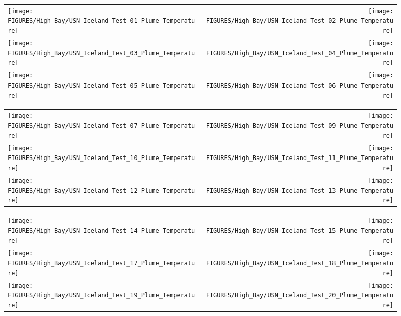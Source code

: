 \begin{figure}[h!]
\begin{tabular*}{\textwidth}{l@{\extracolsep{\fill}}r}
\texttt{[image: FIGURES/High\_Bay/USN\_Iceland\_Test\_01\_Plume\_Temperature]} &
\texttt{[image: FIGURES/High\_Bay/USN\_Iceland\_Test\_02\_Plume\_Temperature]} \\
\texttt{[image: FIGURES/High\_Bay/USN\_Iceland\_Test\_03\_Plume\_Temperature]} &
\texttt{[image: FIGURES/High\_Bay/USN\_Iceland\_Test\_04\_Plume\_Temperature]} \\
\texttt{[image: FIGURES/High\_Bay/USN\_Iceland\_Test\_05\_Plume\_Temperature]} &
\texttt{[image: FIGURES/High\_Bay/USN\_Iceland\_Test\_06\_Plume\_Temperature]} \\
\end{tabular*}
\label{USN_Plume_Iceland_Plume_Temperature}
\end{figure}

\begin{figure}[p]
\begin{tabular*}{\textwidth}{l@{\extracolsep{\fill}}r}
\texttt{[image: FIGURES/High\_Bay/USN\_Iceland\_Test\_07\_Plume\_Temperature]} &
\texttt{[image: FIGURES/High\_Bay/USN\_Iceland\_Test\_09\_Plume\_Temperature]} \\
\texttt{[image: FIGURES/High\_Bay/USN\_Iceland\_Test\_10\_Plume\_Temperature]} &
\texttt{[image: FIGURES/High\_Bay/USN\_Iceland\_Test\_11\_Plume\_Temperature]} \\
\texttt{[image: FIGURES/High\_Bay/USN\_Iceland\_Test\_12\_Plume\_Temperature]} &
\texttt{[image: FIGURES/High\_Bay/USN\_Iceland\_Test\_13\_Plume\_Temperature]} \\
\end{tabular*}
\label{USN_Plume_Iceland_2}
\end{figure}

\begin{figure}[p]
\begin{tabular*}{\textwidth}{l@{\extracolsep{\fill}}r}
\texttt{[image: FIGURES/High\_Bay/USN\_Iceland\_Test\_14\_Plume\_Temperature]} &
\texttt{[image: FIGURES/High\_Bay/USN\_Iceland\_Test\_15\_Plume\_Temperature]} \\
\texttt{[image: FIGURES/High\_Bay/USN\_Iceland\_Test\_17\_Plume\_Temperature]} &
\texttt{[image: FIGURES/High\_Bay/USN\_Iceland\_Test\_18\_Plume\_Temperature]} \\
\texttt{[image: FIGURES/High\_Bay/USN\_Iceland\_Test\_19\_Plume\_Temperature]} &
\texttt{[image: FIGURES/High\_Bay/USN\_Iceland\_Test\_20\_Plume\_Temperature]} \\
\end{tabular*}
\label{USN_Plume_Iceland_3}
\end{figure}

